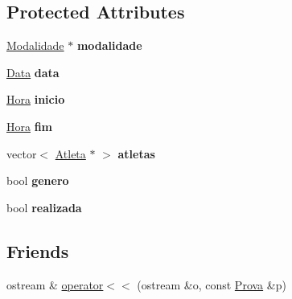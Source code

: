 \subsection*{Protected Attributes}
\begin{DoxyCompactItemize}
\item 
\hypertarget{class_prova_a72061eddcdd4bbe05f083f812fd4c233}{}\hyperlink{class_modalidade}{Modalidade} $\ast$ {\bfseries modalidade}\label{class_prova_a72061eddcdd4bbe05f083f812fd4c233}

\item 
\hypertarget{class_prova_a18c9307475b75a77097e3f7b3b95359a}{}\hyperlink{class_data}{Data} {\bfseries data}\label{class_prova_a18c9307475b75a77097e3f7b3b95359a}

\item 
\hypertarget{class_prova_ae258a1a827472ff56e43910ff2b81a7e}{}\hyperlink{class_hora}{Hora} {\bfseries inicio}\label{class_prova_ae258a1a827472ff56e43910ff2b81a7e}

\item 
\hypertarget{class_prova_a67feb63b78712f2cd8aa0348c7e855ed}{}\hyperlink{class_hora}{Hora} {\bfseries fim}\label{class_prova_a67feb63b78712f2cd8aa0348c7e855ed}

\item 
\hypertarget{class_prova_a8561eecd9076cb8707eb99d90a89989d}{}vector$<$ \hyperlink{class_atleta}{Atleta} $\ast$ $>$ {\bfseries atletas}\label{class_prova_a8561eecd9076cb8707eb99d90a89989d}

\item 
\hypertarget{class_prova_a633da82d6916845b64bd5bdc2c6d6ad9}{}bool {\bfseries genero}\label{class_prova_a633da82d6916845b64bd5bdc2c6d6ad9}

\item 
\hypertarget{class_prova_ac2d537804224ac83c957db49ffcecef6}{}bool {\bfseries realizada}\label{class_prova_ac2d537804224ac83c957db49ffcecef6}

\end{DoxyCompactItemize}
\subsection*{Friends}
\begin{DoxyCompactItemize}
\item 
ostream \& \hyperlink{class_prova_a61b5beb563a366c43426f70b375cff61}{operator$<$$<$} (ostream \&o, const \hyperlink{class_prova}{Prova} \&p)
\end{DoxyCompactItemize}


